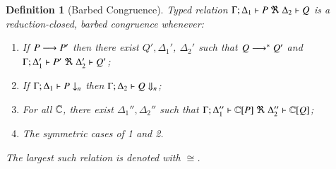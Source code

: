 \documentclass[preprint,11pt]{elsarticle}
\newtheorem{definition}{Definition}[section]
\begin{document}
\begin{definition}[Barbed Congruence]
\label{def:rc}
	Typed relation
	$\horel{\Gamma}{\Delta_1}{P}{\ \Re\ }{\Delta_2}{Q}$
	is a {\em reduction-closed, barbed congruence} whenever:
	\begin{enumerate}[1.]
		\item	If $P \longrightarrow P'$ then there exist $Q', \Delta_1'$,  $\Delta_2'$ such that $Q \longrightarrow^* Q'$ and
			$\horel{\Gamma}{\Delta_1'}{P'}{\ \Re\ }{\Delta_2'}{Q'}$; 

			\item	If $\Gamma;\Delta_1 \vdash P \downarrow_{n}$ then $\Gamma;\Delta_2 \vdash Q \Downarrow_{n}$; %


		\item	For all ${\mathbb{C}}$, there exist $\Delta_1'',\Delta_2''$ such that  $\horel{\Gamma}{\Delta_1''}{\context{\C}{P}}{\ \Re\ }{\Delta_2''}{\context{\C}{Q}}$;
		                      \item	The symmetric cases of 1 and 2.                
	\end{enumerate}
	The largest such relation is denoted with $\cong$.
\end{definition}
\end{document}

